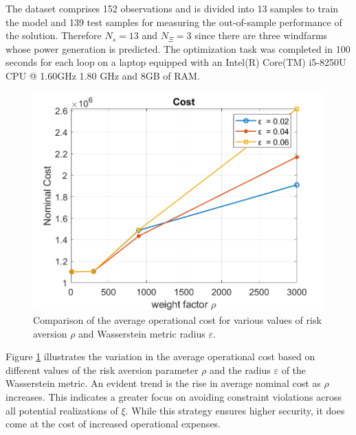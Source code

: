 \documentclass[11pt,a4paper,oneside,openany]{book}
\numberwithin{definition}{section}
\numberwithin{theorem}{section}
\numberwithin{problem}{section}
\begin{document}
The dataset comprises 152 observations and is divided into 13 samples to train the model and 139 test samples for measuring the out-of-sample performance of the solution. Therefore $N_s = 13$ and $N_{\Xi} = 3$ since there are three windfarms whose power generation is predicted. The optimization task was completed in 100 seconds for each loop on a laptop equipped with an Intel(R) Core(TM) i5-8250U CPU @ 1.60GHz 1.80 GHz and 8GB of RAM. 

\begin{figure}[ht]
    \centering
    \includegraphics[scale=0.6]{immagini/AverageOpCost.png}
    \caption{Comparison of the average operational cost for various values of risk aversion $\rho$ and Wasserstein metric radius $\varepsilon$.}
    \label{AverageOPCost}
\end{figure}

\noindent
Figure \ref{AverageOPCost} illustrates the variation in the average operational cost based on different values of the risk aversion parameter \( \rho \) and the radius \( \varepsilon \) of the Wasserstein metric. An evident trend is the rise in average nominal cost as \( \rho \) increases. This indicates a greater focus on avoiding constraint violations across all potential realizations of \( \xi \). While this strategy ensures higher security, it does come at the cost of increased operational expenses.
\end{document}
